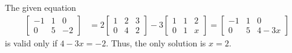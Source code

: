 The given equation
\begin{align*}
\begin{bmatrix} -1 & 1 & 0 \\ 0 & 5  & -2 \end{bmatrix} 
&= 
2\begin{bmatrix} 1 & 2 & 3 \\ 0 & 4 & 2 \end{bmatrix} - 
3\begin{bmatrix} 1 & 1 & 2 \\ 0 & 1 & x \end{bmatrix} 
= 
\begin{bmatrix} -1 & 1 & 0 \\ 0 &5  & 4 - 3x \end{bmatrix}
\end{align*}
is valid only if $4 - 3x = -2$.  Thus, the only solution is $x = 2$.
